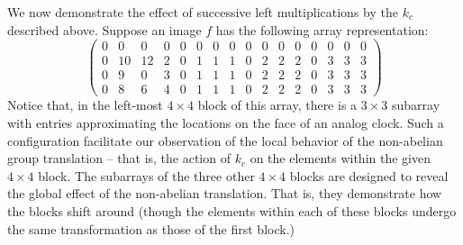 We now demonstrate the effect of successive left
multiplications by the $k_c$ described above.  
Suppose an image $f$ has the following array representation:
{\footnotesize
\begin{equation*}
\left(
\begin{array}{cccc|cccc|cccc|cccc}
0&0& 0  & 0 & 0 & 0 & 0 & 0 & 0 & 0 & 0 & 0 & 0 & 0 & 0 & 0 \\ 
0&10& 12 & 2 & 0 & 1 & 1 & 1 & 0 & 2 & 2 & 2 & 0 & 3 & 3 & 3 \\ 
0&9& 0  & 3 & 0 & 1 & 1 & 1 & 0 & 2 & 2 & 2 & 0 & 3 & 3 & 3 \\ 
0&8& 6  & 4 & 0 & 1 & 1 & 1 & 0 & 2 & 2 & 2 & 0 & 3 & 3 & 3 
\end{array}\right)
\end{equation*}
}
Notice that, in the left-most $4\times 4$ block of this
array, there is a $3\times 3$ subarray with entries
approximating the locations on the face of an analog clock.  
Such a configuration facilitate our observation of the local
behavior of the non-abelian group translation -- that is,
the action of $k_c$ on the elements within the given
$4\times 4$ block.  The subarrays of the 
three other $4\times 4$ blocks are designed to reveal the
global effect of the non-abelian translation.  That is, they
demonstrate how the blocks shift around (though the
elements within each of these blocks undergo the same
transformation as those of the first block.)

